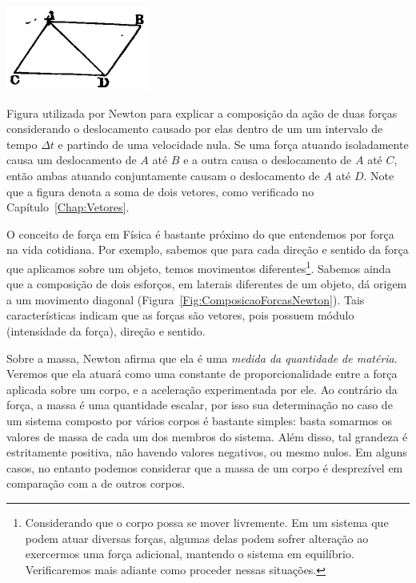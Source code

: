 \begin{marginfigure}
\centering
\includegraphics[width= 0.7\linewidth]{Fig/177px-Principia1846-084.png}
\caption{Figura utilizada por Newton para explicar a composição da ação de duas forças  considerando o deslocamento causado por elas dentro de um um intervalo de tempo $\Delta t$ e partindo de uma velocidade nula. Se uma força atuando isoladamente causa um deslocamento de $A$ até $B$ e a outra causa o deslocamento de $A$ até $C$, então ambas atuando conjuntamente causam o deslocamento de $A$ até $D$. Note que a figura denota a soma de dois vetores, como verificado no Capítulo~\ref{Chap:Vetores}.\label{Fig:ComposicaoForcasNewton}}
\end{marginfigure}


\noindent{}O conceito de força em Física é bastante próximo do que entendemos por força na vida cotidiana. Por exemplo, sabemos que para cada direção e sentido da força que aplicamos sobre um objeto, temos movimentos diferentes\footnote{Considerando que o corpo possa se mover livremente. Em um sistema que podem atuar diversas forças, algumas delas podem sofrer alteração ao exercermos uma força adicional, mantendo o sistema em equilíbrio. Verificaremos mais adiante como proceder nessas situações.}. Sabemos ainda que a composição de dois esforços, em laterais diferentes de um objeto, dá origem a um movimento diagonal (Figura~\ref{Fig:ComposicaoForcasNewton}). Tais características indicam que as forças são vetores, pois possuem módulo (intensidade da força), direção e sentido.

Sobre a massa, Newton afirma que ela é uma \emph{medida da quantidade de matéria}. Veremos que ela atuará como uma constante de proporcionalidade entre a força aplicada sobre um corpo, e a aceleração experimentada por ele. Ao contrário da força, a massa é uma quantidade escalar, por isso sua determinação no caso de um sistema composto por vários corpos é bastante simples: basta somarmos os valores de massa de cada um dos membros do sistema. Além disso, tal grandeza é estritamente positiva, não havendo valores negativos, ou mesmo nulos. Em alguns casos, no entanto podemos considerar que a massa de um corpo é desprezível em comparação com a de outros corpos.

